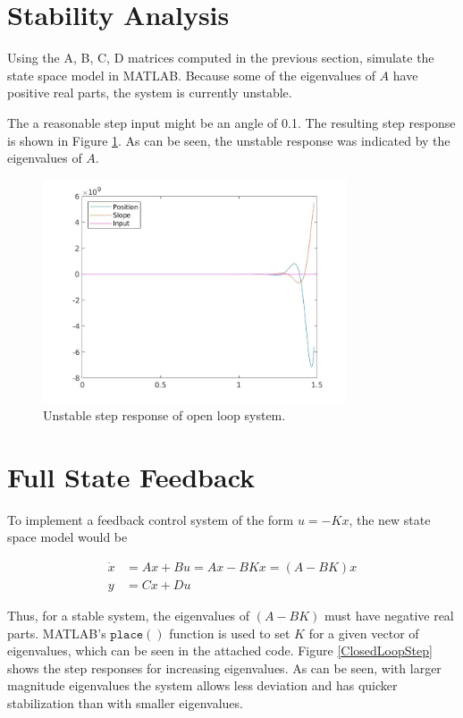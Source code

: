 \documentclass{journal}
\begin{document}
\section*{Stability Analysis}
Using the A, B, C, D matrices computed in the previous section, simulate the state space model in MATLAB.  Because some of the eigenvalues of $A$ have positive real parts, the system is currently unstable.

The a reasonable step input might be an angle of 0.1.  The resulting step response is shown in Figure \ref{OpenLoopStep}.  As can be seen, the unstable response was indicated by the eigenvalues of $A$.
\begin{figure}
	\centering
	\includegraphics[width = 0.8\textwidth]{ES155Lab2_1b_step}
	\caption{Unstable step response of open loop system.}
	\label{OpenLoopStep}
\end{figure}

\section*{Full State Feedback}
To implement a feedback control system of the form $u = -Kx$, the new state space model would be

\begin{align*}
	\dot{x} &= Ax + Bu = Ax - BKx = (A - BK)x\\
	y &= Cx + Du
\end{align*}

Thus, for a stable system, the eigenvalues of $(A - BK)$ must have negative real parts.  MATLAB's $\mathtt{place()}$ function is used to set $K$ for a given vector of eigenvalues, which can be seen in the attached code.  Figure \ref{ClosedLoopStep} shows the step responses for increasing eigenvalues.  As can be seen, with larger magnitude eigenvalues the system allows less deviation and has quicker stabilization than with smaller eigenvalues.
\end{document}
